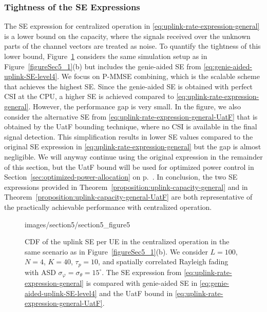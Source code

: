 \vspace{-2mm}

\subsubsection{Tightness of the SE Expressions}

\vspace{-1mm}

The SE expression for centralized operation in \eqref{eq:uplink-rate-expression-general} is a lower bound on the capacity, where the signals received over the unknown parts of the channel vectors are treated as noise. To quantify the tightness of this lower bound, Figure~\ref{figureSec5_1x} considers the same simulation setup as in Figure~\ref{figureSec5_1}(b) but includes the genie-aided SE from \eqref{eq:genie-aided-uplink-SE-level4}. We focus on P-MMSE combining, which is the scalable scheme that achieves the highest SE. Since the genie-aided SE is obtained with perfect \gls{CSI} at the CPU, a higher SE is achieved compared to \eqref{eq:uplink-rate-expression-general}. However, the performance gap is very small. In the figure, we also consider the alternative SE from \eqref{eq:uplink-rate-expression-general-UatF} that is obtained by the UatF bounding technique, where no CSI is available in the final signal detection.
This simplification results in lower SE values compared to the original SE expression in \eqref{eq:uplink-rate-expression-general} but the gap is almost negligible.
We will anyway continue using the original expression in the remainder of this section, but the UatF bound will be used for optimized power control in Section~\ref{sec:optimized-power-allocation} on p.~\pageref{sec:optimized-power-allocation}.  In conclusion, the two SE expressions provided in Theorem~\ref{proposition:uplink-capacity-general} and in Theorem~\ref{proposition:uplink-capacity-general-UatF} are both representative of the practically achievable performance with centralized operation.

\begin{figure}[t!] \centering 
	\begin{overpic}[width=0.88\columnwidth,tics=10]{images/section5/section5_figure5}
	\end{overpic} 
	\caption{CDF of the uplink SE per UE in the centralized operation in the same scenario as in Figure~\ref{figureSec5_1}(b). We consider $L=100$, $N=4$, $K=40$, $\tau_p=10$, and spatially correlated Rayleigh  fading with ASD $\sigma_{\varphi}=\sigma_{\theta}=15^{\circ}$. The SE expression from \eqref{eq:uplink-rate-expression-general} is compared with genie-aided SE in \eqref{eq:genie-aided-uplink-SE-level4} and the UatF bound in \eqref{eq:uplink-rate-expression-general-UatF}.}    \vspace{+2mm}
	\label{figureSec5_1x} 
\end{figure}

